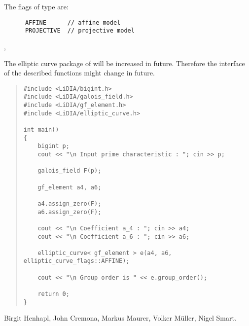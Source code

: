 The flags of type  are:
\begin{verbatim}
      AFFINE      // affine model
      PROJECTIVE  // projective model
\end{verbatim}



\SEEALSO

,



\NOTES

The elliptic curve package of \LiDIA will be increased in future.  Therefore
the interface of the described functions might change in future.


\EXAMPLES

\begin{quote}
\begin{verbatim}
#include <LiDIA/bigint.h>
#include <LiDIA/galois_field.h>
#include <LiDIA/gf_element.h>
#include <LiDIA/elliptic_curve.h>

int main()
{
    bigint p;
    cout << "\n Input prime characteristic : "; cin >> p;

    galois_field F(p);

    gf_element a4, a6;

    a4.assign_zero(F);
    a6.assign_zero(F);

    cout << "\n Coefficient a_4 : "; cin >> a4;
    cout << "\n Coefficient a_6 : "; cin >> a6;

    elliptic_curve< gf_element > e(a4, a6, elliptic_curve_flags::AFFINE);

    cout << "\n Group order is " << e.group_order();

    return 0;
}
\end{verbatim}
\end{quote}



\AUTHOR

Birgit Henhapl, John Cremona, Markus Maurer, Volker M\"uller, Nigel Smart.
